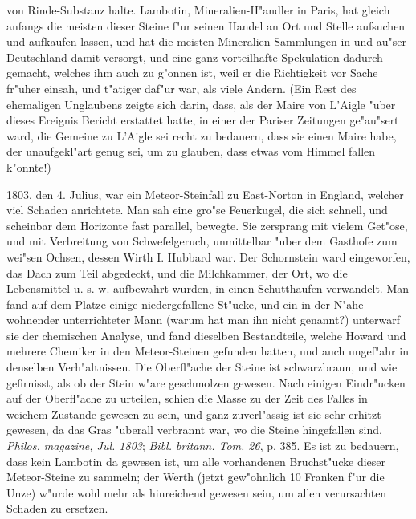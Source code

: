 \documentclass[a4paper, 11pt, oneside, polutonikogreek, german]{article}
\begin{document}
von Rinde-Substanz halte. Lambotin, Mineralien-H"andler in Paris, hat gleich anfangs die meisten dieser Steine f"ur seinen Handel an Ort und Stelle aufsuchen und aufkaufen lassen, und hat die meisten Mineralien-Sammlungen in und au"ser Deutschland damit versorgt, und eine ganz vorteilhafte Spekulation dadurch gemacht, welches ihm auch zu g"onnen ist, weil er die Richtigkeit vor Sache fr"uher einsah, und t"atiger daf"ur war, als viele Andern. (Ein Rest des ehemaligen Unglaubens zeigte sich darin, dass, als der Maire von L'Aigle "uber dieses Ereignis Bericht erstattet hatte, in einer der Pariser Zeitungen ge"au"sert ward, die Gemeine zu L'Aigle sei recht zu bedauern, dass sie einen Maire habe, der unaufgekl"art genug sei, um zu glauben, dass etwas vom Himmel fallen k"onnte!)

1803, den 4. Julius, war ein Meteor-Steinfall zu East-Norton in England, welcher viel Schaden anrichtete. Man sah eine gro"se Feuerkugel, die sich schnell, und scheinbar dem Horizonte fast parallel, bewegte. Sie zersprang mit vielem Get"ose, und mit Verbreitung von Schwefelgeruch, unmittelbar "uber dem Gasthofe zum wei"sen Ochsen, dessen Wirth I. Hubbard war. Der Schornstein ward eingeworfen, das Dach zum Teil abgedeckt, und die Milchkammer, der Ort, wo die Lebensmittel u. s. w. aufbewahrt wurden, in einen Schutthaufen verwandelt. Man fand auf dem Platze einige niedergefallene St"ucke, und ein in der N"ahe wohnender unterrichteter Mann (warum hat man ihn nicht genannt?) unterwarf sie der chemischen Analyse, und fand dieselben Bestandteile, welche Howard und mehrere Chemiker in den Meteor-Steinen gefunden hatten, und auch ungef"ahr in denselben Verh"altnissen. Die Oberfl"ache der Steine ist schwarzbraun, und wie gefirnisst, als ob der Stein w"are geschmolzen gewesen. Nach einigen Eindr"ucken auf der Oberfl"ache zu urteilen, schien die Masse zu der Zeit des Falles in weichem Zustande gewesen zu sein, und ganz zuverl"assig ist sie sehr erhitzt gewesen, da das Gras "uberall verbrannt war, wo die Steine hingefallen sind. \emph{Philos. magazine, Jul. 1803}; \emph{Bibl. britann. Tom. 26}, p. 385. Es ist zu bedauern, dass kein Lambotin da gewesen ist, um alle vorhandenen Bruchst"ucke dieser Meteor-Steine zu sammeln; der Werth (jetzt gew"ohnlich 10 Franken f"ur die Unze) w"urde wohl mehr als hinreichend gewesen sein, um allen verursachten Schaden zu ersetzen.
\end{document}

